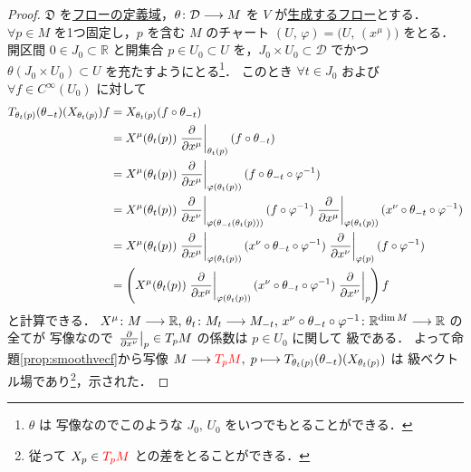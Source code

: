 \documentclass[geometry_main]{subfiles}
\begin{document}
\begin{proof}
    $\mathfrak{D}$ を\hyperref[def:local-flow]{フローの定義域}，$\theta \colon \mathcal{D} \longrightarrow M$ を $V$ が\hyperref[thm:fundamental-flow]{生成するフロー}とする．
    $\forall p \in M$ を1つ固定し，$p$ を含む $M$ のチャート $(U,\, \varphi) = \bigl( U,\, (x^\mu) \bigr) $ をとる．
    開区間 $0 \in J_0 \subset \mathbb{R}$ と開集合 $p \in U_0 \subset U$ を，$J_0 \times U_0 \subset \mathcal{D}$ でかつ $\theta (J_0 \times U_0) \subset U$ を充たすようにとる\footnote{$\theta$ は \cinfty 写像なのでこのような $J_0,\, U_0$ をいつでもとることができる．}．
    このとき $\forall t \in J_0$ および $\forall f \in C^\infty(U_0)$ に対して
    \begin{align}
        T_{\theta_t(p)}(\theta_{-t})(X_{\theta_t(p)}) f
        &= X_{\theta_t(p)} (f \circ \theta_{-t}) \\
        &= X^\mu (\theta_t(p)) \eval{\pdv{}{x^\mu}}_{\theta_t(p)} (f \circ \theta_{-t}) \\
        &= X^\mu (\theta_t(p)) \eval{\pdv{}{x^\mu}}_{\varphi(\theta_t(p))} (f \circ \theta_{-t} \circ \varphi^{-1}) \\
        &= X^\mu (\theta_t(p)) \eval{\pdv{}{x^\nu}}_{\varphi(\theta_{-t}(\theta_t(p)))} (f \circ \varphi^{-1}) \eval{\pdv{}{x^\mu}}_{\varphi(\theta_t(p))}(x^\nu \circ \theta_{-t} \circ \varphi^{-1}) \\
        &= X^\mu (\theta_t(p)) \eval{\pdv{}{x^\mu}}_{\varphi(\theta_t(p))}(x^\nu \circ \theta_{-t} \circ \varphi^{-1}) \eval{\pdv{}{x^\nu}}_{\varphi(p)} (f \circ \varphi^{-1}) \\
        &= \left(X^\mu (\theta_t(p)) \eval{\pdv{}{x^\mu}}_{\varphi(\theta_t(p))}(x^\nu \circ \theta_{-t} \circ \varphi^{-1}) \eval{\pdv{}{x^\nu}}_{p}\right) f
    \end{align}
    と計算できる．
    $X^\mu \colon M \longrightarrow \mathbb{R},\, \theta_t \colon M_t \longrightarrow M_{-t},\, x^\nu \circ \theta_{-t} \circ \varphi^{-1} \colon \mathbb{R}^{\dim M} \longrightarrow \mathbb{R}$ の全てが \cinfty 写像なので $\eval{\pdv{}{x^\nu}}_{p} \in T_p M$ の係数は $p \in U_0$ に関して \cinfty 級である．
    よって命題\ref{prop:smoothvecf}から写像 $M \longrightarrow \textcolor{red}{T_p M},\; p \longmapsto T_{\theta_t(p)}(\theta_{-t})(X_{\theta_t(p)})$ は \cinfty 級ベクトル場であり\footnote{従って $X_p \in \textcolor{red}{T_p M}$ との差をとることができる．}，示された．
\end{proof}
\end{document}
